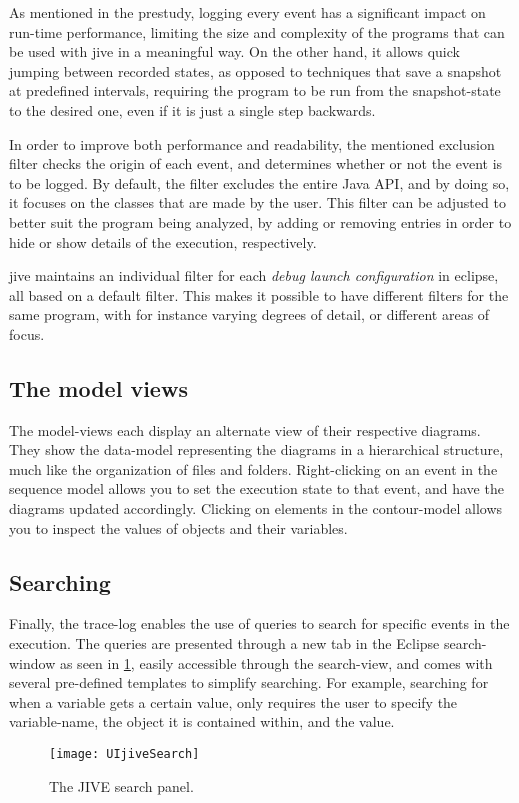As mentioned in the prestudy, logging every event has a significant impact on run-time performance, limiting the size and complexity of the programs that can be used with \gls{jive} in a meaningful way.
On the other hand, it allows quick jumping between recorded states, as opposed to techniques that save a snapshot at predefined intervals, requiring the program to be run from the snapshot-state to the desired one, even if it is just a single step backwards.

In order to improve both performance and readability, the mentioned exclusion filter checks the origin of each event, and determines whether or not the event is to be logged.
By default, the filter excludes the entire Java API, and by doing so, it focuses on the classes that are made by the user.
This filter can be adjusted to better suit the program being analyzed, by adding or removing entries in order to hide or show details of the execution, respectively.

\gls{jive} maintains an individual filter for each \emph{debug launch configuration} in eclipse, all based on a default filter.
This makes it possible to have different filters for the same program, with for instance varying degrees of detail, or different areas of focus.

\subsection{The model views}\label{jiveFeatModelView}

The model-views each display an alternate view of their respective diagrams.
They show the data-model representing the diagrams in a hierarchical structure, much like the organization of files and folders.
Right-clicking on an event in the sequence model allows you to set the execution state to that event, and have the diagrams updated accordingly.
Clicking on elements in the contour-model allows you to inspect the values of objects and their variables.

\subsection{Searching}\label{jiveFeatSearch}

Finally, the trace-log enables the use of queries to search for specific events in the execution.
The queries are presented through a new tab in the Eclipse search-window as seen in \cref{fig:UIjiveSearchPanel}, easily accessible through the search-view, and comes with several pre-defined templates to simplify searching.
For example, searching for when a variable gets a certain value, only requires the user to specify the variable-name, the object it is contained within, and the value.
\begin{figure}[H]
	\centering
	\texttt{[image: UIjiveSearch]}
	\caption{The JIVE search panel.}
	\label{fig:UIjiveSearchPanel}
\end{figure}

